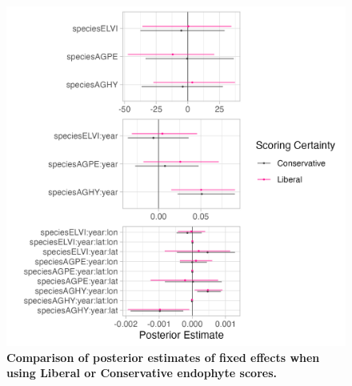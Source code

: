 \documentclass[11pt]{article}
\begin{document}
\begin{figure}[H]
	\centering
	\includegraphics[width = \linewidth]{fixed_plot.png}
	\caption{\textbf{Comparison of posterior estimates of fixed effects when using Liberal or Conservative endophyte scores.}}
\end{figure}
\end{document}
